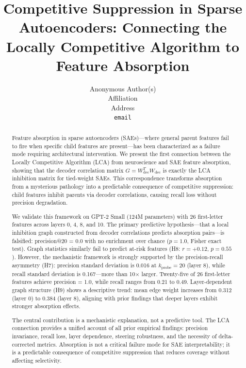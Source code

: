 \documentclass{article}
\title{Competitive Suppression in Sparse Autoencoders: Connecting the Locally Competitive Algorithm to Feature Absorption}
\author{%
  Anonymous Author(s) \\
  Affiliation \\
  Address \\
  \texttt{email} \\
}
\begin{document}
\maketitle

\begin{abstract}
Feature absorption in sparse autoencoders (SAEs)---where general parent features fail to fire when specific child features are present---has been characterized as a failure mode requiring architectural intervention. We present the first connection between the Locally Competitive Algorithm (LCA) from neuroscience and SAE feature absorption, showing that the decoder correlation matrix $G = W_{\text{dec}}^T W_{\text{dec}}$ is exactly the LCA inhibition matrix for tied-weight SAEs. This correspondence transforms absorption from a mysterious pathology into a predictable consequence of competitive suppression: child features inhibit parents via decoder correlations, causing recall loss without precision degradation.

We validate this framework on GPT-2 Small (124M parameters) with 26 first-letter features across layers 0, 4, 8, and 10. The primary predictive hypothesis---that a local inhibition graph constructed from decoder correlations predicts absorption pairs---is falsified: precision@20 = 0.0 with no enrichment over chance ($p = 1.0$, Fisher exact test). Graph statistics similarly fail to predict at-risk features (H8: $r = +0.12$, $p = 0.55$). However, the mechanistic framework is strongly supported by the precision-recall asymmetry (H7): precision standard deviation is 0.016 at $k_{\text{probe}} = 20$ (layer 8), while recall standard deviation is 0.167---more than 10$\times$ larger. Twenty-five of 26 first-letter features achieve precision = 1.0, while recall ranges from 0.21 to 0.49. Layer-dependent graph structure (H9) shows a descriptive trend: mean edge weight increases from 0.312 (layer 0) to 0.384 (layer 8), aligning with prior findings that deeper layers exhibit stronger absorption effects.

The central contribution is a mechanistic explanation, not a predictive tool. The LCA connection provides a unified account of all prior empirical findings: precision invariance, recall loss, layer dependence, steering robustness, and the necessity of delta-corrected metrics. Absorption is not a critical failure mode for SAE interpretability; it is a predictable consequence of competitive suppression that reduces coverage without affecting selectivity.
\end{abstract}
\end{document}
